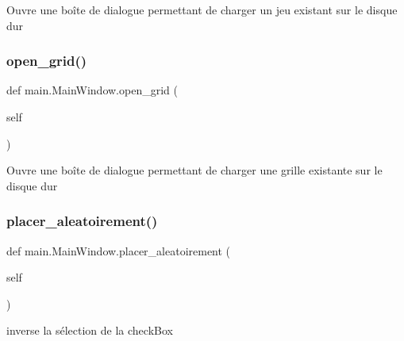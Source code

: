\begin{DoxyVerb}Ouvre une boîte de dialogue permettant de charger un jeu existant sur le disque dur\end{DoxyVerb}
 \mbox{\label{classmain_1_1MainWindow_a960159ca187e8bb3a2a53a6ba312331c}} 
\subsubsection{\texorpdfstring{open\+\_\+grid()}{open\_grid()}}
{\footnotesize\ttfamily def main.\+Main\+Window.\+open\+\_\+grid (\begin{DoxyParamCaption}\item[{}]{self }\end{DoxyParamCaption})}

\begin{DoxyVerb}Ouvre une boîte de dialogue permettant de charger une grille existante sur le disque dur\end{DoxyVerb}
 \mbox{\label{classmain_1_1MainWindow_a61ccbf8b887753b6db3ff19e65e4bc9b}} 
\subsubsection{\texorpdfstring{placer\+\_\+aleatoirement()}{placer\_aleatoirement()}}
{\footnotesize\ttfamily def main.\+Main\+Window.\+placer\+\_\+aleatoirement (\begin{DoxyParamCaption}\item[{}]{self }\end{DoxyParamCaption})}

\begin{DoxyVerb}inverse la sélection de la checkBox \end{DoxyVerb}
 \mbox{\label{classmain_1_1MainWindow_ad908d5e23984194a3d4dd878489931c4}} 
